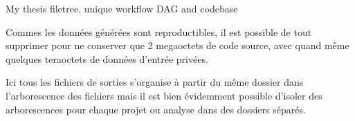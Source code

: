 \begin{frame}[fragile]{My thesis filetree, unique workflow DAG and codebase}
{    Commes les données générées sont reproductibles, il est possible de tout supprimer pour ne conserver que 2 megaoctets de code source, avec quand même quelques teraoctets de données d'entrée privées.

    Ici tous les fichiers de sorties s'organise à partir du même dossier dans l'arborescence des fichiers mais il est bien évidemment possible d'isoler des arborescences pour chaque projet ou analyse dans des dossiers séparés.
    }%
  \end{frame}
